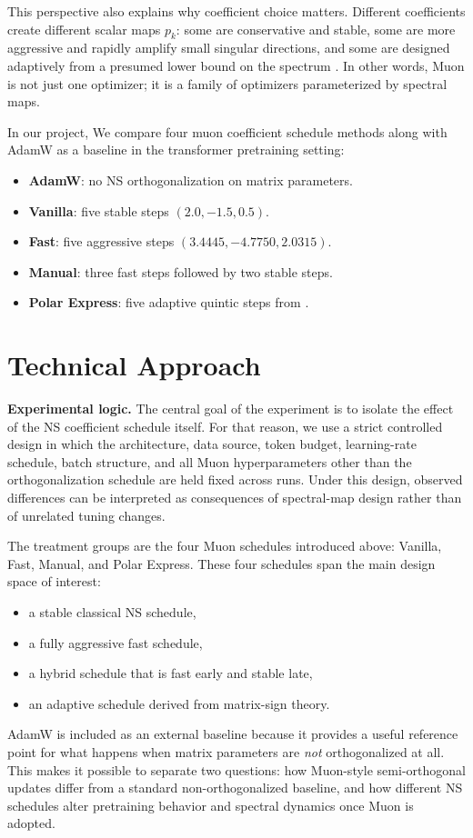 \documentclass[10pt]{article}
\begin{document}
This perspective also explains why coefficient choice matters. Different coefficients create different scalar maps $p_k$: some are conservative and stable, some are more aggressive and rapidly amplify small singular directions, and some are designed adaptively from a presumed lower bound on the spectrum \citep{amsel2025polar}. In other words, Muon is not just one optimizer; it is a family of optimizers parameterized by spectral maps.

In our project, We compare four muon coefficient schedule methods along with AdamW as a baseline in the transformer pretraining setting:
\begin{itemize}
    \item \textbf{AdamW}: no NS orthogonalization on matrix parameters.
    \item \textbf{Vanilla}: five stable steps $(2.0,-1.5,0.5)$.
    \item \textbf{Fast}: five aggressive steps $(3.4445,-4.7750,2.0315)$.
    \item \textbf{Manual}: three fast steps followed by two stable steps.
    \item \textbf{Polar Express}: five adaptive quintic steps from \citet{amsel2025polar}.
\end{itemize}

\section{Technical Approach}
\textbf{Experimental logic.}
The central goal of the experiment is to isolate the effect of the NS coefficient schedule itself. For that reason, we use a strict controlled design in which the architecture, data source, token budget, learning-rate schedule, batch structure, and all Muon hyperparameters other than the orthogonalization schedule are held fixed across runs. Under this design, observed differences can be interpreted as consequences of spectral-map design rather than of unrelated tuning changes.

The treatment groups are the four Muon schedules introduced above: Vanilla, Fast, Manual, and Polar Express. These four schedules span the main design space of interest:
\begin{itemize}
    \item a stable classical NS schedule,
    \item a fully aggressive fast schedule,
    \item a hybrid schedule that is fast early and stable late,
    \item an adaptive schedule derived from matrix-sign theory.
\end{itemize}
AdamW is included as an external baseline because it provides a useful reference point for what happens when matrix parameters are \emph{not} orthogonalized at all. This makes it possible to separate two questions: how Muon-style semi-orthogonal updates differ from a standard non-orthogonalized baseline, and how different NS schedules alter pretraining behavior and spectral dynamics once Muon is adopted.
\end{document}
